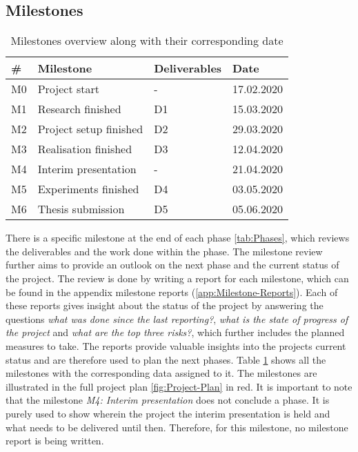 \subsection{Milestones}
\label{sec:Milestones-Project}
\begin{table}[htb]
    \centering
    \caption{Milestones overview along with their corresponding date}
	\label{tab:Milestones}
    \begin{tabular}{p{} | p{} | p{} | p{}}
        \toprule
        \textbf{\#} & \textbf{Milestone} & \textbf{Deliverables} & \textbf{Date} \\ 
        \midrule[1pt]
        M0 & Project start & - & 17.02.2020\\
        \hline
        M1 & Research finished & D1 & 15.03.2020\\
        \hline
        M2 & Project setup finished & D2 & 29.03.2020\\
        \hline
        M3 & Realisation finished & D3 & 12.04.2020\\
        \hline
        M4 & Interim presentation & - & 21.04.2020\\
        \hline
        M5 & Experiments finished & D4 & 03.05.2020\\
        \hline
        M6 & Thesis submission & D5 & 05.06.2020\\
        \bottomrule
    \end{tabular}
\end{table}
\noindent
There is a specific milestone at the end of each phase \ref{tab:Phases}, which reviews the deliverables and the work done within the phase. The milestone review further aims to provide an outlook on the next phase and the current status of the project. The review is done by writing a report for each milestone, which can be found in the appendix milestone reports (\ref{app:Milestone-Reports}). Each of these reports gives insight about the status of the project by answering the questions \textit{what was done since the last reporting?}, \textit{what is the state of progress of the project} and \textit{what are the top three risks?}, which further includes the planned measures to take. The reports provide valuable insights into the projects current status and are therefore used to plan the next phases. Table \ref{tab:Milestones} shows all the milestones with the corresponding data assigned to it. The milestones are illustrated in the full project plan \ref{fig:Project-Plan} in red.
\newline
\newline
It is important to note that the milestone \textit{M4: Interim presentation} does not conclude a phase. It is purely used to show wherein the project the interim presentation is held and what needs to be delivered until then. Therefore, for this milestone, no milestone report is being written.

